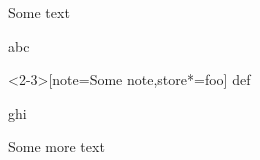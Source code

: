 \documentclass{ltx-talk}
\begin{document}
\begin{frame}
\end{frame}

\begin{frame}
Some text
\begin{theorem}[store=abc]
abc
\end{theorem}
\begin{theorem}<2-3>[note=Some note,store*=foo]
def
\end{theorem}
\begin{theorem}[last]
ghi
\end{theorem}
Some more text
\end{frame}
\end{document}
